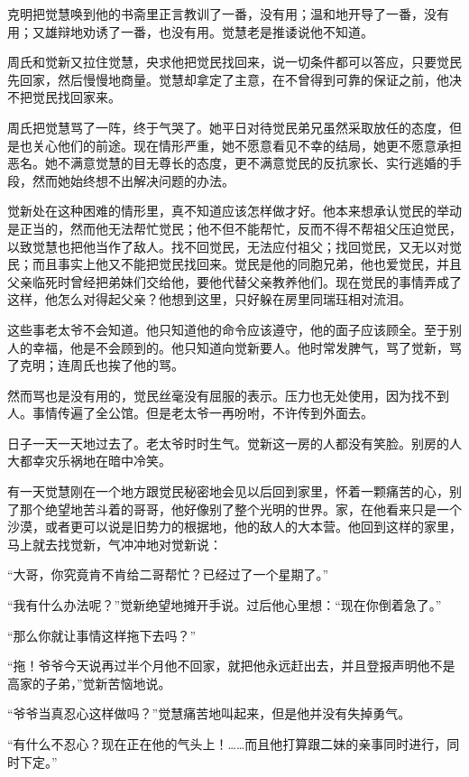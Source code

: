 \par 克明把觉慧唤到他的书斋里正言教训了一番，没有用；温和地开导了一番，没有用；又雄辩地劝诱了一番，也没有用。觉慧老是推诿说他不知道。
\par 周氏和觉新又拉住觉慧，央求他把觉民找回来，说一切条件都可以答应，只要觉民先回家，然后慢慢地商量。觉慧却拿定了主意，在不曾得到可靠的保证之前，他决不把觉民找回家来。
\par 周氏把觉慧骂了一阵，终于气哭了。她平日对待觉民弟兄虽然采取放任的态度，但是也关心他们的前途。现在情形严重，她不愿意看见不幸的结局，她更不愿意承担恶名。她不满意觉慧的目无尊长的态度，更不满意觉民的反抗家长、实行逃婚的手段，然而她始终想不出解决问题的办法。
\par 觉新处在这种困难的情形里，真不知道应该怎样做才好。他本来想承认觉民的举动是正当的，然而他无法帮忙觉民；他不但不能帮忙，反而不得不帮祖父压迫觉民，以致觉慧也把他当作了敌人。找不回觉民，无法应付祖父；找回觉民，又无以对觉民；而且事实上他又不能把觉民找回来。觉民是他的同胞兄弟，他也爱觉民，并且父亲临死时曾经把弟妹们交给他，要他代替父亲教养他们。现在觉民的事情弄成了这样，他怎么对得起父亲？他想到这里，只好躲在房里同瑞珏相对流泪。
\par 这些事老太爷不会知道。他只知道他的命令应该遵守，他的面子应该顾全。至于别人的幸福，他是不会顾到的。他只知道向觉新要人。他时常发脾气，骂了觉新，骂了克明；连周氏也挨了他的骂。
\par 然而骂也是没有用的，觉民丝毫没有屈服的表示。压力也无处使用，因为找不到人。事情传遍了全公馆。但是老太爷一再吩咐，不许传到外面去。
\par 日子一天一天地过去了。老太爷时时生气。觉新这一房的人都没有笑脸。别房的人大都幸灾乐祸地在暗中冷笑。
\par 有一天觉慧刚在一个地方跟觉民秘密地会见以后回到家里，怀着一颗痛苦的心，别了那个绝望地苦斗着的哥哥，他好像别了整个光明的世界。家，在他看来只是一个沙漠，或者更可以说是旧势力的根据地，他的敌人的大本营。他回到这样的家里，马上就去找觉新，气冲冲地对觉新说：
\par “大哥，你究竟肯不肯给二哥帮忙？已经过了一个星期了。”
\par “我有什么办法呢？”觉新绝望地摊开手说。过后他心里想：“现在你倒着急了。”
\par “那么你就让事情这样拖下去吗？”
\par “拖！爷爷今天说再过半个月他不回家，就把他永远赶出去，并且登报声明他不是高家的子弟，”觉新苦恼地说。
\par “爷爷当真忍心这样做吗？”觉慧痛苦地叫起来，但是他并没有失掉勇气。
\par “有什么不忍心？现在正在他的气头上！……而且他打算跟二妹的亲事同时进行，同时下定。”
